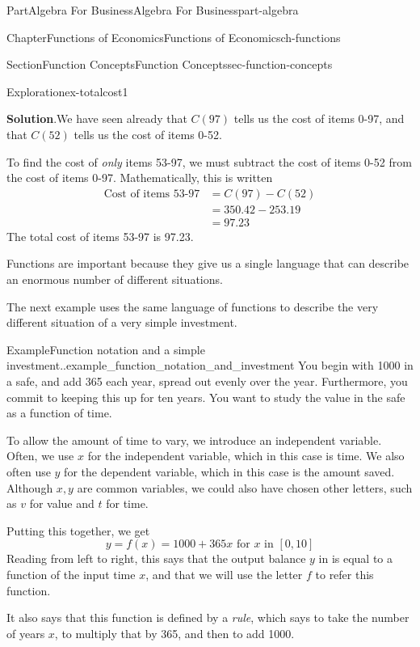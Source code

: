 \documentclass{tufte-book}
\newcommand{\blocktitlefont}{\relax}
\numberwithin{equation}{chapter}
\newcommand{\amp}{&}
\begin{document}
\begin{partptx}{Part}{Algebra For Business}{}{Algebra For Business}{}{}{part-algebra}
\begin{chapterptx}{Chapter}{Functions of Economics}{}{Functions of Economics}{}{}{ch-functions}
\begin{sectionptx}{Section}{Function Concepts}{}{Function Concepts}{}{}{sec-function-concepts}
\begin{exploration}{Exploration}{}{ex-totalcost1}
\begin{enumerate}[font=\bfseries,label=(\alph*),ref=\alph*]
\noindent\textbf{\blocktitlefont Solution}.\hypertarget{ex-totalcost1-4-2}{}\quad{}We have seen already that \(C(97)\) tells us the cost of items 0-97, and that \(C(52)\) tells us the cost of items 0-52.%
\par
To find the cost of \emph{only} items 53-97, we must subtract the cost of items 0-52 from the cost of items 0-97. Mathematically, this is written%
\begin{align*}
\text{Cost of items 53-97} \amp = C(97) - C(52) \\
\amp = 350.42 - 253.19\\
\amp = 97.23
\end{align*}
The total cost of items 53-97 is \textdollar{}97.23.%
\end{enumerate}%
\end{exploration}%
Functions are important because they give us a single language that can describe an enormous number of different situations.%
\par
The next example uses the same language of functions to describe the very different situation of a very simple investment.%
\begin{example}{Example}{Function notation and a simple investment..}{example_function_notation_and_investment}%
You begin with \textdollar{}1000 in a safe, and add \textdollar{}365 each year, spread out evenly over the year. Furthermore, you commit to keeping this up for ten years. You want to study the value in the safe as a function of time.%
\par
To allow the amount of time to vary, we introduce an independent variable. Often, we use \(x\) for the independent variable, which in this case is time. We also often use \(y\) for the dependent variable, which in this case is the amount saved. Although \(x,y\) are common variables, we could also have chosen other letters, such as \(v\) for value and \(t\) for time.%
\par
Putting this together, we get%
\begin{equation*}
y = f(x) = 1000 + 365 x \text{ for }x\text{ in } [0,10]
\end{equation*}
Reading from left to right, this says that the output balance \(y\) in \textdollar{} is equal to a function of the input time \(x\), and that we will use the letter \(f\) to refer this function.%
\par
It also says that this function is defined by a \emph{rule}, which says to take the number of years \(x\), to multiply that by 365, and then to add \textdollar{}1000.%
\par

\end{example}
\end{sectionptx}
\end{chapterptx}
\end{partptx}
\end{document}
